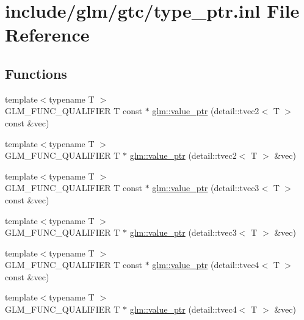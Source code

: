 \hypertarget{type__ptr_8inl}{\section{include/glm/gtc/type\-\_\-ptr.inl \-File \-Reference}
\label{type__ptr_8inl}
}
\subsection*{\-Functions}
\begin{DoxyCompactItemize}
\item 
{\footnotesize template$<$typename T $>$ }\\\-G\-L\-M\-\_\-\-F\-U\-N\-C\-\_\-\-Q\-U\-A\-L\-I\-F\-I\-E\-R \-T const $\ast$ \hyperlink{group__gtc__type__ptr_ga57d829c43ef1f8bbe196343744392069}{glm\-::value\-\_\-ptr} (detail\-::tvec2$<$ \-T $>$ const \&vec)
\item 
{\footnotesize template$<$typename T $>$ }\\\-G\-L\-M\-\_\-\-F\-U\-N\-C\-\_\-\-Q\-U\-A\-L\-I\-F\-I\-E\-R \-T $\ast$ \hyperlink{group__gtc__type__ptr_ga70900f03d3f6eead08cbeb8eebe2a596}{glm\-::value\-\_\-ptr} (detail\-::tvec2$<$ \-T $>$ \&vec)
\item 
{\footnotesize template$<$typename T $>$ }\\\-G\-L\-M\-\_\-\-F\-U\-N\-C\-\_\-\-Q\-U\-A\-L\-I\-F\-I\-E\-R \-T const $\ast$ \hyperlink{group__gtc__type__ptr_ga10a568d24db822588013d8087b67eaad}{glm\-::value\-\_\-ptr} (detail\-::tvec3$<$ \-T $>$ const \&vec)
\item 
{\footnotesize template$<$typename T $>$ }\\\-G\-L\-M\-\_\-\-F\-U\-N\-C\-\_\-\-Q\-U\-A\-L\-I\-F\-I\-E\-R \-T $\ast$ \hyperlink{group__gtc__type__ptr_ga3dfe9e6a5ebc3beeaa3a8b35cf2ffe1d}{glm\-::value\-\_\-ptr} (detail\-::tvec3$<$ \-T $>$ \&vec)
\item 
{\footnotesize template$<$typename T $>$ }\\\-G\-L\-M\-\_\-\-F\-U\-N\-C\-\_\-\-Q\-U\-A\-L\-I\-F\-I\-E\-R \-T const $\ast$ \hyperlink{group__gtc__type__ptr_ga75dd1f5ad6d007990c1f2cf55fe63789}{glm\-::value\-\_\-ptr} (detail\-::tvec4$<$ \-T $>$ const \&vec)
\item 
{\footnotesize template$<$typename T $>$ }\\\-G\-L\-M\-\_\-\-F\-U\-N\-C\-\_\-\-Q\-U\-A\-L\-I\-F\-I\-E\-R \-T $\ast$ \hyperlink{group__gtc__type__ptr_ga63ee2093cab935f4471fdc55484aeb63}{glm\-::value\-\_\-ptr} (detail\-::tvec4$<$ \-T $>$ \&vec)

\end{DoxyCompactItemize}
